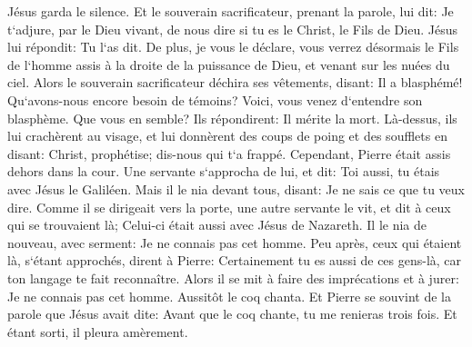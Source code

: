 \verse Jésus garda le silence. Et le souverain sacrificateur, prenant la parole, lui dit: Je t`adjure, par le Dieu vivant, de nous dire si tu es le Christ, le Fils de Dieu. 
\verse Jésus lui répondit: Tu l`as dit. De plus, je vous le déclare, vous verrez désormais le Fils de l`homme assis à la droite de la puissance de Dieu, et venant sur les nuées du ciel. 
\verse Alors le souverain sacrificateur déchira ses vêtements, disant: Il a blasphémé! Qu`avons-nous encore besoin de témoins? Voici, vous venez d`entendre son blasphème. Que vous en semble? 
\verse Ils répondirent: Il mérite la mort. 
\verse Là-dessus, ils lui crachèrent au visage, et lui donnèrent des coups de poing et des soufflets en disant: 
\verse Christ, prophétise; dis-nous qui t`a frappé. 
\verse Cependant, Pierre était assis dehors dans la cour. Une servante s`approcha de lui, et dit: Toi aussi, tu étais avec Jésus le Galiléen. 
\verse Mais il le nia devant tous, disant: Je ne sais ce que tu veux dire. 
\verse Comme il se dirigeait vers la porte, une autre servante le vit, et dit à ceux qui se trouvaient là; Celui-ci était aussi avec Jésus de Nazareth. 
\verse Il le nia de nouveau, avec serment: Je ne connais pas cet homme. 
\verse Peu après, ceux qui étaient là, s`étant approchés, dirent à Pierre: Certainement tu es aussi de ces gens-là, car ton langage te fait reconnaître. 
\verse Alors il se mit à faire des imprécations et à jurer: Je ne connais pas cet homme. Aussitôt le coq chanta. 
\verse Et Pierre se souvint de la parole que Jésus avait dite: Avant que le coq chante, tu me renieras trois fois. Et étant sorti, il pleura amèrement. 

\chapter{}

